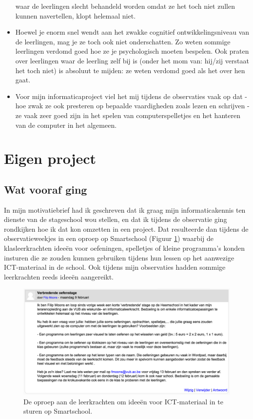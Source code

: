 \documentclass[a4paper,11pt]{article}
\theoremstyle{definition}
\begin{document}
\begin{itemize}
  waar de leerlingen slecht 
  behandeld worden omdat ze het toch niet zullen kunnen navertellen, klopt helemaal niet.
  \item Hoewel je enorm snel wendt aan het zwakke cognitief ontwikkelingsniveau 
  van de leerlingen, mag je ze toch ook niet onderschatten. Zo weten sommige 
  leerlingen verdomd goed hoe ze je psychologisch moeten bespelen. Ook praten 
  over leerlingen waar de leerling zelf bij is (onder het mom van: hij/zij verstaat het toch niet) 
  is absoluut te mijden: ze weten verdomd goed als het over hen gaat.
  \item Voor mijn informaticaproject viel het mij tijdens de observaties vaak op 
  dat - hoe zwak ze ook presteren op bepaalde vaardigheden zoals lezen en 
  schrijven - ze vaak zeer goed zijn in het spelen van computerspelletjes en het 
  hanteren van de computer in het algemeen. 
  
  
  
\end{itemize}

\newpage
\section{Eigen project}\label{project}
\subsection{Wat vooraf ging}
In mijn motivatiebrief had ik geschreven dat ik graag mijn informaticakennis ten 
dienste van de stageschool wou stellen, en dat ik tijdens de observatie ging rondkijken 
hoe ik dat kon omzetten in een project. Dat resulteerde dan tijdens de observatieweekjes in een oproep op Smartschool (Figuur \ref{oproep}) waarbij de klasleerkrachten ideeën voor oefeningen, spelletjes of kleine programma's konden insturen die 
ze zouden kunnen gebruiken tijdens hun lessen op het aanwezige ICT-materiaal in de school. Ook tijdens mijn observaties hadden sommige leerkrachten reeds ideeën aangereikt. \begin{figure}[h!]
  \centering
  \includegraphics[scale=0.27]{oproep.jpg}\caption{De oproep aan de leerkrachten om ideeën voor ICT-materiaal in te sturen op Smartschool.}\label{oproep}
\end{figure}
\\
 
\end{document}
